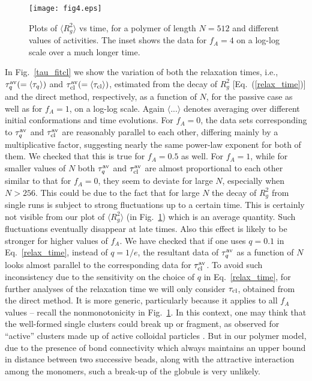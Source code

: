 \documentclass[aps,prx,reprint,showpacs,showkeys,noeprint,longbibliography]{revtex4-1} %
\begin{document}
\begin{figure}[t!]
	\centering
	\texttt{[image: fig4.eps]}
	\caption{\label{rg_fa} Plots of $\langle R_g^2 \rangle$ vs time, for a polymer of length $N=512$ and different values of 
	activities. The inset shows the data for $f_A=4$ on a log-log scale over a much longer time.}
\end{figure}
\par 
In Fig.~\ref{tau_fitcl} we show the variation of both the relaxation times, i.e., $\tau_q^{\rm{av}} (= \langle \tau_q \rangle)$ and $\tau_{\rm{cl}}^{\rm{av}} (= \langle \tau_{\rm{cl}} \rangle)$, estimated from the decay of $R_g^2$ [Eq.~(\ref{relax_time})] and the direct method, respectively, as a function of $N$, for the passive case as well as for $f_A=1$, on a log-log scale. Again $\langle ... \rangle$ denotes averaging over different initial conformations and time evolutions. For $f_A=0$, the data sets corresponding to $\tau_q^{\rm{av}}$ and $\tau_{\rm{cl}}^{\rm{av}}$ are reasonably parallel 
to each other, differing mainly by a multiplicative factor, suggesting nearly the same power-law exponent for both of them. We checked that this is true for $f_A=0.5$ as well. For $f_A=1$, while for smaller values of $N$ both $\tau_q^{\rm{av}}$ and $\tau_{\rm{cl}}^{\rm{av}}$ are almost proportional to each other similar to that for $f_A=0$, they seem to deviate for large $N$, especially when $N > 256$. 
This could be due to the fact that for large $N$ the decay of $R_g^2$ from single runs is subject to strong fluctuations up to a certain time. This is certainly not visible from our plot of $\langle R_g^2 \rangle$ (in Fig.~\ref{rg_fa}) which is an average quantity.   Such fluctuations eventually disappear at late times. Also this effect is likely to be stronger for higher values of $f_A$. We have checked that if one uses $q=0.1$ in Eq.~\eqref{relax_time}, instead of $q=1/e$, the resultant data of $\tau_q^{\rm{av}}$ as a function of $N$ looks almost parallel to the corresponding data for $\tau_{\rm{cl}}^{\rm{av}}$. To avoid such inconsistency due to the sensitivity on the choice of $q$ in Eq.~\eqref{relax_time}, for further analyses of the relaxation time we will only consider $\tau_{\rm{cl}}$, obtained from the direct method.
It is more generic, particularly because it applies to all $f_A$ values -- recall the nonmonotonicity in Fig.~\ref{rg_fa}. In this context, one may think that the well-formed single clusters could break up or fragment, as observed for ``active'' clusters made up of active colloidal particles \cite{ginot18}.  But in our polymer model, due to the presence of bond connectivity which always maintains an upper bound in distance between two successive beads, along with the attractive interaction among the monomers, such a break-up of the globule is very unlikely.
\end{document}
